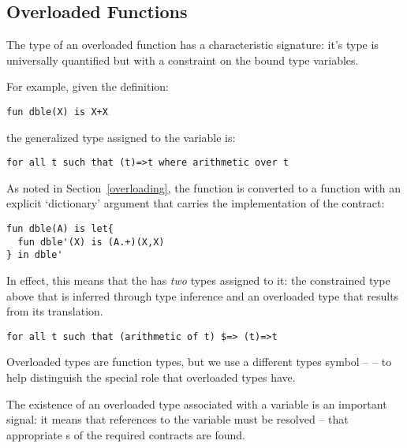 \begin{prooftree}
\end{prooftree}


\subsection{Overloaded Functions}
\label{overloadedFunctions}
The type of an overloaded function has a characteristic signature: it's type is universally quantified but with a constraint on the bound type variables.

For example, given the definition:
\begin{lstlisting}
fun dble(X) is X+X
\end{lstlisting}
the generalized type assigned to the  variable is:
\begin{lstlisting}
for all t such that (t)=>t where arithmetic over t
\end{lstlisting}

As noted in Section~\vref{overloading}, the  function is converted to a function with an explicit `dictionary' argument that carries the implementation of the  contract:
\begin{lstlisting}
fun dble(A) is let{
  fun dble'(X) is (A.+)(X,X)
} in dble'
\end{lstlisting}
In effect, this means that the  has \emph{two} types assigned to it: the constrained type above that is inferred through type inference and an overloaded type that results from its translation.
\begin{lstlisting}
for all t such that (arithmetic of t) $=> (t)=>t
\end{lstlisting}
\begin{aside}
Overloaded types are function types, but we use a different types symbol -- \q{\$=>} -- to help distinguish the special role that overloaded types have.
\end{aside}

\begin{aside}
The existence of an overloaded type associated with a variable is an important signal: it means that references to the variable must be resolved -- that appropriate s of the required contracts are found.
\end{aside}


